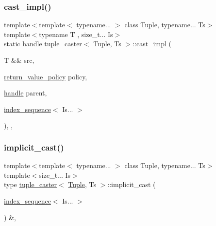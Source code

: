 \subsubsection{\texorpdfstring{cast\_impl()}{cast\_impl()}}
{\footnotesize\ttfamily template$<$template$<$ typename... $>$ class Tuple, typename... Ts$>$ \\
template$<$typename T , size\+\_\+t... Is$>$ \\
static \mbox{\hyperlink{classhandle}{handle}} \mbox{\hyperlink{classtuple__caster}{tuple\+\_\+caster}}$<$ \mbox{\hyperlink{_python-ast_8h_a3f332c0be139cb870e516bad9b6a9366}{Tuple}}, Ts $>$\+::cast\+\_\+impl (\begin{DoxyParamCaption}\item[{T \&\&}]{src,  }\item[{\mbox{\hyperlink{detail_2common_8h_adde72ab1fb0dd4b48a5232c349a53841}{return\+\_\+value\+\_\+policy}}}]{policy,  }\item[{\mbox{\hyperlink{classhandle}{handle}}}]{parent,  }\item[{\mbox{\hyperlink{structindex__sequence}{index\+\_\+sequence}}$<$ Is... $>$}]{ }\end{DoxyParamCaption})\hspace{0.3cm}{\ttfamily [inline]}, {\ttfamily [static]}, {\ttfamily [protected]}}

\mbox{\label{classtuple__caster_a9f833c2141a2bd5d3ae2625752436aba}} 
\subsubsection{\texorpdfstring{implicit\_cast()}{implicit\_cast()}\hspace{0.1cm}{\footnotesize\ttfamily [1/2]}}
{\footnotesize\ttfamily template$<$template$<$ typename... $>$ class Tuple, typename... Ts$>$ \\
template$<$size\+\_\+t... Is$>$ \\
type \mbox{\hyperlink{classtuple__caster}{tuple\+\_\+caster}}$<$ \mbox{\hyperlink{_python-ast_8h_a3f332c0be139cb870e516bad9b6a9366}{Tuple}}, Ts $>$\+::implicit\+\_\+cast (\begin{DoxyParamCaption}\item[{\mbox{\hyperlink{structindex__sequence}{index\+\_\+sequence}}$<$ Is... $>$}]{ }\end{DoxyParamCaption}) \&\hspace{0.3cm}{\ttfamily [inline]}, {\ttfamily [protected]}}

